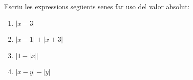 \begin{exercici}
Escriu les expressions següents senes far uso del valor absolut:

\begin{enumerate}
\item[a)] $\left\vert x-3\right\vert $

\item[b)] $\left\vert x-1\right\vert +\left\vert x+3\right\vert $

\item[c)] $\left\vert 1-\left\vert x\right\vert \right\vert $

\item[d)] $\left\vert x-y\right\vert -\left\vert y\right\vert $
\end{enumerate}

\end{exercici}

